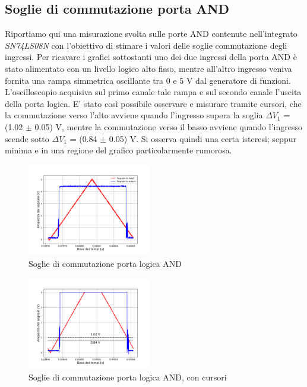 \documentclass[journal]{IEEEtran}
\begin{document}
\begin{appendices}

\section{Soglie di commutazione porta AND}

Riportiamo qui una misurazione svolta sulle porte AND contenute nell'integrato \textit{SN74LS08N} con l'obiettivo di stimare i valori delle soglie commutazione degli ingressi. Per ricavare i grafici sottostanti uno dei due ingressi della porta AND è stato alimentato con un livello logico alto fisso, mentre all'altro ingresso veniva fornita una rampa simmetrica oscillante tra 0 e 5 V dal generatore di funzioni. L'oscilloscopio acquisiva sul primo canale tale rampa e sul secondo canale l'uscita della porta logica. E' stato così possibile osservare e misurare tramite cursori, che la commutazione verso l'alto avviene quando l'ingresso supera la soglia ${\Delta}V_1$ = (1.02 $\pm$ 0.05) V, mentre la commutazione verso il basso avviene quando l'ingresso scende sotto ${\Delta}V_1$ = (0.84 $\pm$ 0.05) V. Si osserva quindi una certa isteresi; seppur minima e in una regione del grafico particolarmente rumorosa.

\begin{figure}[H]%
\begin{center}
\includegraphics[width=0.48\textwidth]{analysis/output/and-switching.pdf}
\caption{Soglie di commutazione porta logica AND}
\label{fig:AND-switching}
\end{center}
\end{figure}



\begin{figure}[H]%
\begin{center}
\includegraphics[width=0.48\textwidth]{analysis/output/and-switching2.pdf}
\caption{Soglie di commutazione porta logica AND, con cursori}
\label{fig:AND-switching-cursors}
\end{center}
\end{figure}


\end{appendices}
\end{document}
